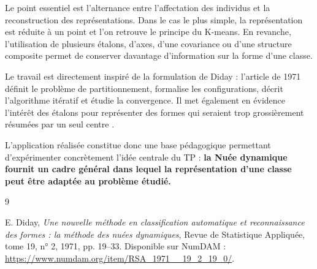\documentclass[12pt,a4paper]{article}
\begin{document}
Le point essentiel est l'alternance entre l'affectation des individus et la reconstruction des représentations. Dans le cas le plus simple, la représentation est réduite à un point et l'on retrouve le principe du K-means. En revanche, l'utilisation de plusieurs étalons, d'axes, d'une covariance ou d'une structure composite permet de conserver davantage d'information sur la forme d'une classe.

Le travail est directement inspiré de la formulation de Diday : l'article de 1971 définit le problème de partitionnement, formalise les configurations, décrit l'algorithme itératif et étudie la convergence. Il met également en évidence l'intérêt des étalons pour représenter des formes qui seraient trop grossièrement résumées par un seul centre \cite{diday1971}.

L'application réalisée constitue donc une base pédagogique permettant d'expérimenter concrètement l'idée centrale du TP : \textbf{la Nuée dynamique fournit un cadre général dans lequel la représentation d'une classe peut être adaptée au problème étudié.}

\begin{thebibliography}{9}

E. Diday,
\textit{Une nouvelle méthode en classification automatique et reconnaissance des formes : la méthode des nuées dynamiques},
Revue de Statistique Appliquée, tome 19, n° 2, 1971, pp. 19--33.
Disponible sur NumDAM :
\url{https://www.numdam.org/item/RSA_1971__19_2_19_0/}.

\end{thebibliography}
\end{document}
